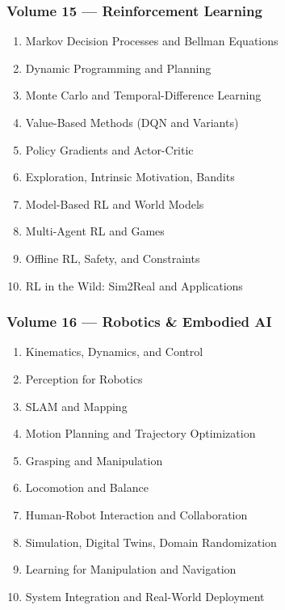 \documentclass[
  letterpaper,
  DIV=11,
  numbers=noendperiod]{scrreprt}
\providecommand{\tightlist}{%
  \setlength{\itemsep}{0pt}\setlength{\parskip}{0pt}}
\begin{document}
\subsubsection{Volume 15 --- Reinforcement
Learning}\label{volume-15-reinforcement-learning}

\begin{enumerate}
\def\labelenumi{\arabic{enumi}.}
\setcounter{enumi}{140}
\tightlist
\item
  Markov Decision Processes and Bellman Equations
\item
  Dynamic Programming and Planning
\item
  Monte Carlo and Temporal-Difference Learning
\item
  Value-Based Methods (DQN and Variants)
\item
  Policy Gradients and Actor-Critic
\item
  Exploration, Intrinsic Motivation, Bandits
\item
  Model-Based RL and World Models
\item
  Multi-Agent RL and Games
\item
  Offline RL, Safety, and Constraints
\item
  RL in the Wild: Sim2Real and Applications
\end{enumerate}

\subsubsection{Volume 16 --- Robotics \& Embodied
AI}\label{volume-16-robotics-embodied-ai}

\begin{enumerate}
\def\labelenumi{\arabic{enumi}.}
\setcounter{enumi}{150}
\tightlist
\item
  Kinematics, Dynamics, and Control
\item
  Perception for Robotics
\item
  SLAM and Mapping
\item
  Motion Planning and Trajectory Optimization
\item
  Grasping and Manipulation
\item
  Locomotion and Balance
\item
  Human-Robot Interaction and Collaboration
\item
  Simulation, Digital Twins, Domain Randomization
\item
  Learning for Manipulation and Navigation
\item
  System Integration and Real-World Deployment
\end{enumerate}
\end{document}
